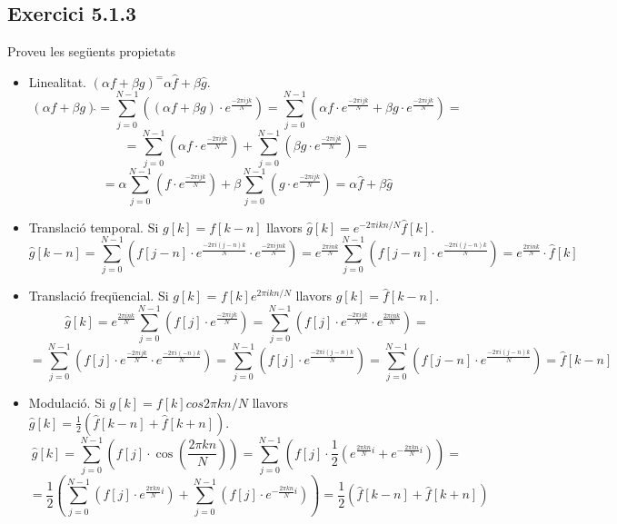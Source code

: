 \documentclass[a4paper, 11pt]{article}
\begin{document}
\subsection{Exercici 5.1.3}
Proveu les següents propietats
\begin{itemize}
    \item Linealitat. $(\alpha f + \beta g)^ = \alpha \hat{f} + \beta \hat{g}$.\\
     $$ (\alpha f + \beta g)\hat{} = \sum_{j = 0}^{N-1} \left( (\alpha f + \beta g)\cdot e^{\frac{−2\pi i j k}{N}}\right) = \sum_{j = 0}^{N-1} \left( \alpha f \cdot e^{\frac{−2\pi i j k}{N}} + \beta g \cdot e^{\frac{−2\pi i j k}{N}}\right) = $$ $$=\sum_{j = 0}^{N-1} \left( \alpha f \cdot e^{\frac{−2\pi i j k}{N}} \right) + \sum_{j = 0}^{N-1} \left( \beta g \cdot e^{\frac{−2\pi i j k}{N}}\right) = $$ $$ = \alpha \sum_{j = 0}^{N-1} \left( f \cdot e^{\frac{−2\pi i j k}{N}} \right) + \beta \sum_{j = 0}^{N-1} \left( g \cdot e^{\frac{−2\pi i j k}{N}}\right) = \alpha \hat{f} + \beta \hat{g}$$
    \item Translació temporal. Si $g[k] = f[k-n]$ llavors $\hat{g}[k] = e^{-2\pi ikn/N} \hat{f}[k]$.\\
    $$ \hat{g}[k-n] = \sum_{j = 0}^{N-1} \left( f[j-n]\cdot e^{\frac{−2\pi i (j-n) k}{N}} \cdot e^{\frac{-2\pi i j n k}{N}}\right) =  e^{\frac{2\pi i n k}{N}} \sum_{j = 0}^{N-1} \left( f[j-n]\cdot e^{\frac{−2\pi i (j-n) k}{N}}\right) = e^{\frac{2\pi i n k}{N}} \cdot \hat{f}[k] $$
    \item Translació freqüencial. Si $g[k]$ = $f[k]e^{2\pi ikn/N}$ llavors $\hat{g}[k] = \hat{f}[k-n]$.\\
    $$ \hat{g}[k] = e^{\frac{2\pi i n k}{N}} \sum_{j = 0}^{N-1} \left( f[j]\cdot e^{\frac{−2\pi i j k}{N}}\right) = \sum_{j = 0}^{N-1} \left( f[j]\cdot e^{\frac{−2\pi i j k}{N}} \cdot e^{\frac{2\pi i n k}{N}}\right) = $$ $$=\sum_{j = 0}^{N-1} \left( f[j]\cdot e^{\frac{−2\pi i j k}{N}} \cdot e^{\frac{-2\pi i (-n) k}{N}}\right) = \sum_{j = 0}^{N-1} \left( f[j]\cdot e^{\frac{−2\pi i (j-n) k}{N}}\right) = \sum_{j = 0}^{N-1} \left( f[j-n]\cdot e^{\frac{−2\pi i (j-n) k}{N}}\right) = \hat{f}[k-n]$$
    \item Modulació. Si $g[k] = f[k]cos2\pi kn/N$ llavors $\hat{g}[k] = \frac{1}{2}(\hat{f}[k-n] + \hat{f}[k+n])$.\\
    $$ \hat{g}[k] = \sum_{j = 0}^{N-1} \left( f[j]\cdot \cos(\frac{2\pi k n}{N}) \right) = \sum_{j = 0}^{N-1} \left( f[j]\cdot \frac{1}{2}\left( e^{\frac{2\pi k n}{N}i} + e^{-\frac{2\pi k n}{N}i} \right) \right) = $$ $$=\frac{1}{2} \left( \sum_{j = 0}^{N-1} \left( f[j]\cdot e^{\frac{2\pi k n}{N}i} \right) + \sum_{j = 0}^{N-1} \left( f[j]\cdot e^{-\frac{2\pi k n}{N}i} \right) \right) = \frac{1}{2} \left( \hat{f}[k-n] + \hat{f}[k+n] \right)$$
\end{itemize}
\end{document}
